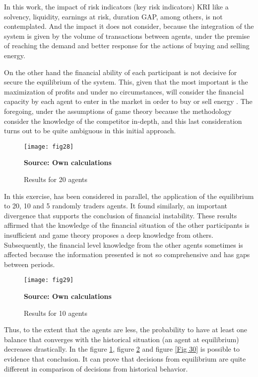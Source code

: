 \documentclass[12pt]{book}
\begin{document}
In this work, the impact of risk indicators (key risk indicators) KRI like a solvency, liquidity, earnings at risk, duration GAP, among others, is not contemplated. And the impact it does not consider, because the integration of the system is given by the volume of transactions between agents, under the premise of reaching the demand and better response for the actions of buying and selling energy. 

On the other hand the financial ability of each participant is not decisive for secure the equilibrium of the system. This, given that the most important is the maximization of profits and under no circumstances, will consider the financial capacity by each agent to enter in the market in order to buy or sell energy \cite{tushar2013}. The foregoing, under the assumptions of game theory because the methodology consider the knowledge of the competitor in-depth, and this last consideration turns out to be quite ambiguous in this initial approach. 

\begin{figure}  
\centering    
\texttt{[image: fig28]}  
\caption{Results for 20 agents}
\scriptsize 
\textbf{Source: Own calculations}
\captionsetup{justification=centering,margin=1cm}   
\label{Fig 28}
\end{figure}

In this exercise, has been considered in parallel, the application of the equilibrium to 20, 10 and 5 randomly traders agents. It found similarly, an important divergence that supports the conclusion of financial instability. These results affirmed that the knowledge of the financial situation of the other participants is insufficient and game theory proposes a deep knowledge from others. Subsequently, the financial level knowledge from the other agents sometimes is affected because the information presented is not so comprehensive and has gaps between periods.

\begin{figure}  
\centering    
\texttt{[image: fig29]}  
\caption{Results for 10 agents}
\scriptsize 
\textbf{Source: Own calculations}
\captionsetup{justification=centering,margin=1cm}   
\label{Fig 29}
\end{figure}

Thus, to the extent that the agents are less, the probability to have at least one balance that converges with the historical situation (an agent at equilibrium) decreases drastically. In the figure \ref{Fig 28}, figure \ref{Fig 29} and figure \ref{Fig 30} is possible to evidence that conclusion. It can prove that decisions from equilibrium are quite different in comparison of decisions from historical behavior. 
\end{document}
